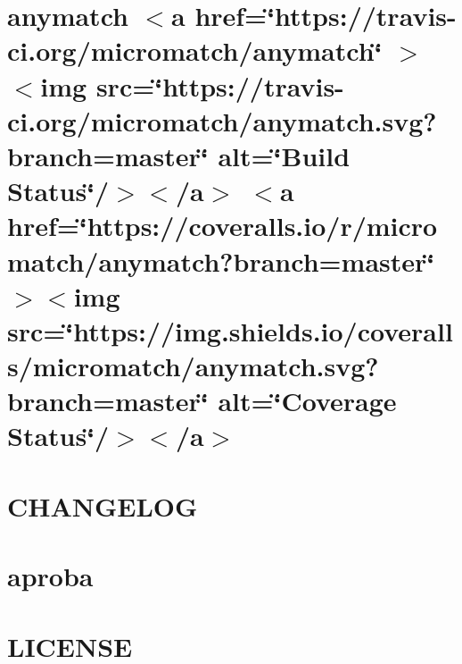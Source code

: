 \documentclass[twoside]{book}
\newcommand{\+}{\discretionary{\mbox{\scriptsize$\hookleftarrow$}}{}{}}
\begin{document}
\chapter{anymatch \texorpdfstring{$<$}{<}a href=\char`\"{}https\+://travis-\/ci.\+org/micromatch/anymatch\char`\"{} \texorpdfstring{$>$}{>}\texorpdfstring{$<$}{<}img src=\char`\"{}https\+://travis-\/ci.\+org/micromatch/anymatch.\+svg?branch=master\char`\"{} alt=\char`\"{}\+Build Status\char`\"{}/\texorpdfstring{$>$}{>}\texorpdfstring{$<$}{<}/a\texorpdfstring{$>$}{>} \texorpdfstring{$<$}{<}a href=\char`\"{}https\+://coveralls.\+io/r/micromatch/anymatch?branch=master\char`\"{} \texorpdfstring{$>$}{>}\texorpdfstring{$<$}{<}img src=\char`\"{}https\+://img.\+shields.\+io/coveralls/micromatch/anymatch.\+svg?branch=master\char`\"{} alt=\char`\"{}\+Coverage Status\char`\"{}/\texorpdfstring{$>$}{>}\texorpdfstring{$<$}{<}/a\texorpdfstring{$>$}{>}}
\label{md__c___users_vaishnavi_jadhav__desktop__developer_code_mean_stack_example_client_node_modules_anymatch__r_e_a_d_m_e}

\chapter{CHANGELOG}
\label{md__c___users_vaishnavi_jadhav__desktop__developer_code_mean_stack_example_client_node_modules_aproba__c_h_a_n_g_e_l_o_g}

\chapter{aproba}
\label{md__c___users_vaishnavi_jadhav__desktop__developer_code_mean_stack_example_client_node_modules_aproba__r_e_a_d_m_e}

\chapter{LICENSE}
\label{md__c___users_vaishnavi_jadhav__desktop__developer_code_mean_stack_example_client_node_modules_are_we_there_yet__l_i_c_e_n_s_e}

\end{document}
